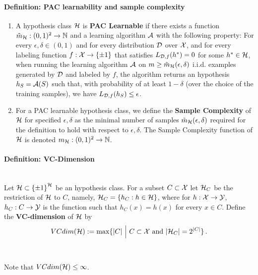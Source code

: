 {\paragraph{Definition: PAC learnability and sample complexity}
\begin{enumerate}
\item
A hypothesis class $\mathcal{H}$ is {\bf PAC Learnable} if there exists a function $\tilde{m}_{\mathcal{H}} : (0,1)^2 \to \mathbb{N}$ and a learning algorithm $\mathcal{A}$ with the following property:
For every $\epsilon,\delta \in (0,1)$ and for every distribution $\mathcal{D}$ over $\mathcal{X}$, and for every labeling function $f:\mathcal{X}\to\{\pm 1\}$ that satisfies $L_{\mathcal{D},f}(h^*)=0$ for some $h^*\in\mathcal{H}$, when running the learning algorithm $\mathcal{A}$ on $m\ge \tilde{m}_{\mathcal{H}}(\epsilon,\delta)$ i.i.d. examples generated by $\mathcal{D}$ and labeled by $f$, the algorithm returns an hypothesis $h_S=\mathcal{A}(S)$ such that, with probability of at least $1-\delta$ (over the choice of the training samples), we have
$
L_{\mathcal{D}, f}(h_S) \le \epsilon
$. 
\item For a PAC learnable hypothesis class, we define the {\bf Sample
  Complexity} of $\mathcal{H}$ for specified $\epsilon,\delta$ as the minimal number of
  samples $\tilde{m}_{\mathcal{H}}(\epsilon,\delta)$ required for the definition to hold
  with respect to $\epsilon,\delta$. The Sample Complexity function of $\mathcal{H}$ is
  denoted $m_{\mathcal{H}}:(0,1)^2\to\mathbb{N}$.
\end{enumerate}

\paragraph{Definition: VC-Dimension}
~\\Let $\mathcal{H}\subset\left\{ \pm 1 \right\}^{\mathcal{H}}$ be an hypothesis class.
For a subset $C\subset \mathcal{X}$ let $\mathcal{H}_C$ be the restriction of $\mathcal{H}$ to $C$, namely,
$\mathcal{H}_C = \{ h_C : h \in \mathcal{H}\}$, where for $h:\mathcal{X}\to\mathcal{Y}$, $h_C:C\to\mathcal{Y}$ is the
function such that $h_C(x)=h(x)$ for every $x\in C$. Define the {\bf VC-dimension} of $\mathcal{H}$ by
\[
  VCdim(\mathcal{H}) := \max\{ |C| ~\Big|~ C\subset\mathcal{X} \,\,\text{and}\,\, |\mathcal{H}_C|=2^{|C|} \}
  \,.
\]
\\~\\
Note that $VCdim(\mathcal{H})\leq \infty$. 

}
